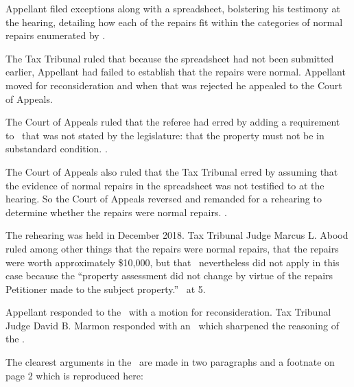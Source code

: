 \documentclass[12pt,\documentclassflag]{michiganCourtOfAppealsBrief}
\def\mathieuGast{\pincite[l]{MCL}{211.27(2)}}
\begin{document}
Appellant filed exceptions along with a spreadsheet, bolstering his testimony at the hearing, detailing how each of the repairs fit within the categories of normal repairs enumerated by \mathieuGast. 

The Tax Tribunal ruled that because the spreadsheet had not been submitted earlier, Appellant had failed to establish that the repairs were normal. Appellant moved for reconsideration and when that was rejected he appealed to the Court of Appeals.

The Court of Appeals ruled that the referee had erred by adding a requirement to \mathieuGast\ that was not stated by the legislature: that the property must not be in substandard condition. .
 
The Court of Appeals also ruled that the Tax Tribunal erred by assuming that the evidence of normal repairs in the spreadsheet was not testified to at the hearing. So the Court of Appeals reversed and remanded for a rehearing to determine whether the repairs were normal repairs. .

The rehearing was held in December 2018. Tax Tribunal Judge Marcus L. Abood ruled among other things that the repairs were normal repairs, that the repairs were worth approximately \$10,000, but that \mathieuGast\ nevertheless did not apply in this case because the ``property assessment did not change by virtue of the repairs Petitioner made to the subject property.'' \FOJ\ at 5.

Appellant responded to the \FOJ\ with a motion for reconsideration. Tax Tribunal Judge David B. Marmon responded with an \orderDenying\ which sharpened the reasoning of the \FOJ. 

The clearest arguments in the \orderDenying\ are made in two paragraphs and a footnate on page 2 which is reproduced here:
\end{document}

